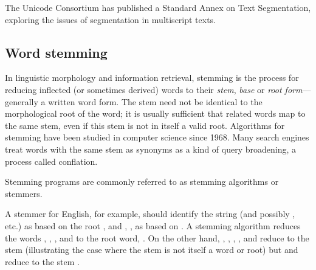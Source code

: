     The Unicode Consortium has published a Standard Annex\cite{Davis2012} on Text Segmentation, exploring the issues of segmentation in multiscript texts.
      

  \subsection{Word stemming}

    In linguistic morphology and information retrieval, stemming is the process for reducing inflected (or sometimes derived) words to their \emph{stem}, \emph{base} or \emph{root form}---generally a written word form. The stem need not be identical to the morphological root of the word; it is usually sufficient that related words map to the same stem, even if this stem is not in itself a valid root. Algorithms for stemming have been studied in computer science since 1968. Many search engines treat words with the same stem as synonyms as a kind of query broadening, a process called conflation.

    Stemming programs are commonly referred to as stemming algorithms or stemmers.      
    
    A stemmer for English, for example, should identify the string  (and possibly ,  etc.) as based on the root , and , ,  as based on . A stemming algorithm reduces the words , , , and  to the root word, . On the other hand, , , , , and  reduce to the stem  (illustrating the case where the stem is not itself a word or root) but  and  reduce to the stem .
    
